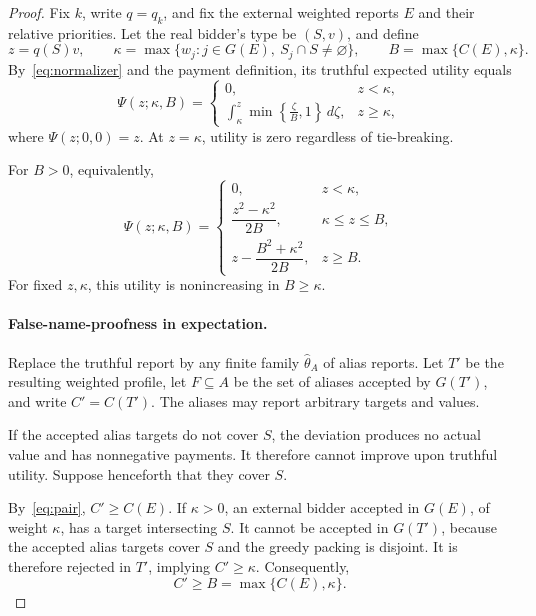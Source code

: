 \documentclass[format=acmsmall, review=false]{acmart}
\begin{document}
\begin{proof}
Fix \(k\), write \(q=q_k\), and fix the external weighted
reports \(E\) and their relative priorities.
Let the real bidder's type be \((S,v)\), and define
\[
z=q(S)v,
\qquad
\kappa=\max\{w_j:j\in G(E),\ S_j\cap S\ne\varnothing\},
\qquad
B=\max\{C(E),\kappa\}.
\]
By~\eqref{eq:normalizer} and the payment definition, its
truthful expected utility equals
\begin{equation}\label{eq:utility}
\Psi(z;\kappa,B)=
\begin{cases}
0,&z<\kappa,\\[1mm]
\displaystyle
\int_\kappa^z\min\left\{\frac{\zeta}{B},1\right\}\,d\zeta,
&z\ge\kappa,
\end{cases}
\end{equation}
where \(\Psi(z;0,0)=z\).
At \(z=\kappa\), utility is zero regardless of tie-breaking.

For \(B>0\), equivalently,
\[
\Psi(z;\kappa,B)=
\begin{cases}
0,&z<\kappa,\\[1mm]
\dfrac{z^2-\kappa^2}{2B},&\kappa\le z\le B,\\[3mm]
z-\dfrac{B^2+\kappa^2}{2B},&z\ge B.
\end{cases}
\]
For fixed \(z,\kappa\), this utility is nonincreasing in \(B\ge\kappa\).

\paragraph{False-name-proofness in expectation.}

Replace the truthful report by any finite family
\(\hat\theta_A\) of alias reports. Let \(T'\) be the resulting
weighted profile,
let \(F\subseteq A\) be the set of aliases accepted by \(G(T')\), and
write \(C'=C(T')\). The aliases may report arbitrary targets
and values.

If the accepted alias targets do not cover \(S\), the
deviation produces no actual value and has nonnegative
payments. It therefore cannot improve upon truthful utility.
Suppose henceforth that they cover \(S\).

By~\eqref{eq:pair}, \(C'\ge C(E)\).
If \(\kappa>0\), an external bidder accepted in \(G(E)\), of weight
\(\kappa\), has a target intersecting \(S\). It cannot be accepted
in \(G(T')\), because the accepted alias targets cover \(S\)
and the greedy packing is disjoint. It is therefore rejected
in \(T'\), implying \(C'\ge\kappa\). Consequently,
\begin{equation}\label{eq:C-comparison}
C'\ge B=\max\{C(E),\kappa\}.
\end{equation}


\end{proof}
\end{document}
